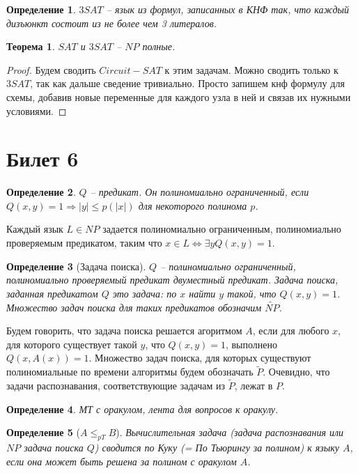 \documentclass[12pt, letterpaper]{article}
\newtheorem{theorem}{Теорема}[section]
\newtheorem{defi}{Определение}[section]
\begin{document}
\begin{defi}
$3SAT$ -- язык из формул, записанных в КНФ так, что каждый дизъюнкт состоит из не более чем 3 литералов. 
\end{defi}

\begin{theorem}
$SAT$ и $3SAT$ -- $NP$ полные.
\end{theorem}

\begin{proof}
Будем сводить $Circuit-SAT$ к этим задачам. Можно сводить только к $3SAT$, так как дальше сведение тривиально. Просто запишем кнф формулу для схемы, добавив новые переменные для каждого узла в ней и связав их нужными условиями.
\end{proof}

\section{Билет 6}
\begin{defi}
$Q$ -- предикат. Он полиномиально ограниченный, если $Q(x, y) = 1 \Rightarrow |y| \leq p(|x|)$ для некоторого полинома $p$.
\end{defi}
Каждый язык $L \in NP$ задается полиномиально ограниченным, полиномиально проверяемым предикатом, таким что $x \in L \Longleftrightarrow \exists y Q(x, y) = 1$.

\begin{defi}[Задача поиска]
$Q$ -- полиномиально ограниченный, полиномиально проверяемый предикат двуместный предикат. Задача поиска, заданная предикатом $Q$ это задача: по $x$ найти $y$ такой, что $Q(x,y)=1$. Множество задач поиска для таких предикатов обозначим $\widetilde{NP}$.
\end{defi}

Будем говорить, что задача поиска решается агоритмом $A$, если для любого $x$, для которого существует такой $y$, что $Q(x,y)=1$, выполнено $Q(x, A(x))=1$. Множество задач поиска, для которых существуют полиномиальные по времени алгоритмы будем обозначать $\widetilde{P}$. Очевидно, что задачи распознавания, соответствующие задачам из $\widetilde{P}$, лежат в $P$.

\begin{defi}
МТ с оракулом, лента для вопросов к оракулу.
\end{defi}

\begin{defi}[$A \leq_{pT} B$]
Вычислительная задача (задача распознавания или $NP$ задача поиска $Q$) сводится по Куку (= По Тьюрингу за полином) к языку $A$, если она может быть решена за полином с оракулом $A$.
\end{defi}
\end{document}
